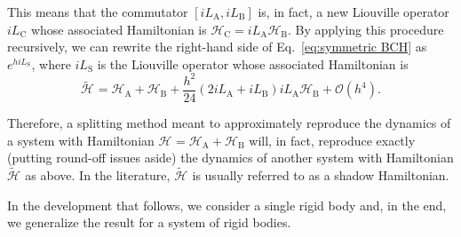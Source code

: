 \documentclass[
journal=jctcce,
layout=twocolumn
]{achemso}
\newcommand{\Ham}[1]{{\mathcal H}_\text{#1}}    %
\newcommand{\Liu}[1]{i\!L_\text{#1}}            %
\newcommand{\timestep}{h}
\newcommand{\refined}[1]{\widetilde{#1}}
\begin{document}
This means that the commutator $[\Liu A,\Liu B]$ is, in fact, a new Liouville operator $\Liu C$ whose associated Hamiltonian is $\Ham C = {\Liu A}{\Ham B}$.
By applying this procedure recursively, we can rewrite the right-hand side of Eq.~\eqref{eq:symmetric BCH} as $e^{\timestep \Liu S}$, where $\Liu S$ is the Liouville operator whose associated Hamiltonian is
\begin{equation*}
\label{eq:general shadow hamiltonian}
\refined{\Ham{}} = \Ham A + \Ham B + \frac{h^2}{24} (2 \Liu A + \Liu B){\Liu A}{\Ham B} + \mathcal{O}(h^4).
\end{equation*}

Therefore, a splitting method meant to approximately reproduce the dynamics of a system with Hamiltonian $\Ham{} = \Ham A + \Ham B$ will, in fact, reproduce exactly (putting round-off issues aside) the dynamics of another system with Hamiltonian $\refined{\Ham{}}$ as above.
In the literature, $\refined{\Ham{}}$ is usually referred to as a shadow Hamiltonian.

In the development that follows, we consider a single rigid body and, in the end, we generalize the result for a system of rigid bodies.
\end{document}
